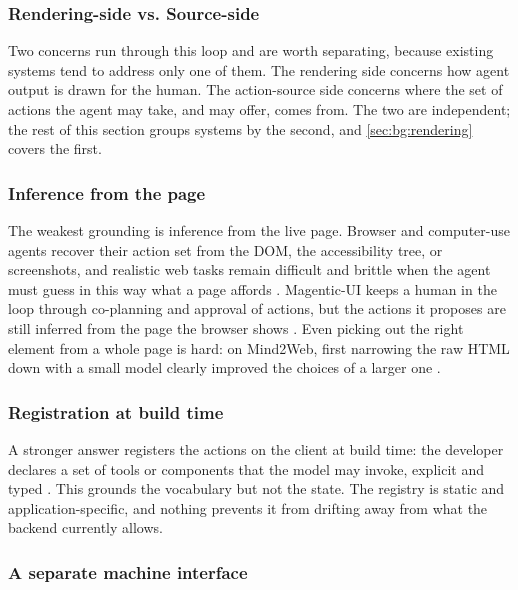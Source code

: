 \subsubsection{Rendering-side vs. Source-side}

Two concerns run through this loop and are worth separating, because existing systems tend to address only one of them.
The rendering side concerns how agent output is drawn for the human.
The action-source side concerns where the set of actions the agent may take, and may offer, comes from.
The two are independent; the rest of this section groups systems by the second, and \autoref{sec:bg:rendering} covers the first.

\subsubsection{Inference from the page}\label{sec:bg:inference}

The weakest grounding is inference from the live page.
Browser and computer-use agents recover their action set from the DOM, the accessibility tree, or screenshots, and realistic web tasks remain difficult and brittle when the agent must guess in this way what a page affords \cite{zhou2024webarena, song2025browsing}.
Magentic-UI keeps a human in the loop through co-planning and approval of actions, but the actions it proposes are still inferred from the page the browser shows \cite{mozannar2025magenticui}.
Even picking out the right element from a whole page is hard: on Mind2Web, first narrowing the raw HTML down with a small model clearly improved the choices of a larger one \cite{deng2023mind2web}.

\subsubsection{Registration at build time}\label{sec:bg:registry}

A stronger answer registers the actions on the client at build time: the developer declares a set of tools or components that the model may invoke, explicit and typed \cite{aisdkGUI}.
This grounds the vocabulary but not the state.
The registry is static and application-specific, and nothing prevents it from drifting away from what the backend currently allows.

\subsubsection{A separate machine interface}\label{sec:bg:mcp}


